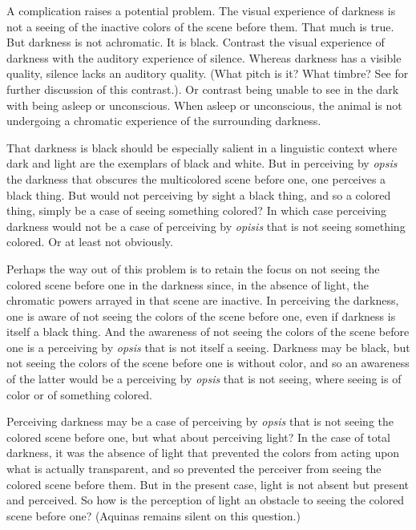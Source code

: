 A complication raises a potential problem. The visual experience of darkness is not a seeing of the inactive colors of the scene before them. That much is true. But darkness is not achromatic. It is black. Contrast the visual experience of darkness with the auditory experience of silence. Whereas darkness has a visible quality, silence lacks an auditory quality. (What pitch is it? What timbre? See \citealt{Sorensen:2009aa} for further discussion of this contrast.). Or contrast being unable to see in the dark with being asleep or unconscious. When asleep or unconscious, the animal is not undergoing a chromatic experience of the surrounding darkness.

That darkness is black should be especially salient in a linguistic context where dark and light are the exemplars of black and white. But in perceiving by \emph{opsis} the darkness that obscures the multicolored scene before one, one perceives a black thing. But would not perceiving by sight a black thing, and so a colored thing, simply be a case of seeing something colored? In which case perceiving darkness would not be a case of perceiving by \emph{opisis} that is not seeing something colored. Or at least not obviously.

Perhaps the way out of this problem is to retain the focus on not seeing the colored scene before one in the darkness since, in the absence of light, the chromatic powers arrayed in that scene are inactive. In perceiving the darkness, one is aware of not seeing the colors of the scene before one, even if darkness is itself a black thing. And the awareness of not seeing the colors of the scene before one is a perceiving by \emph{opsis} that is not itself a seeing. Darkness may be black, but not seeing the colors of the scene before one is without color, and so an awareness of the latter would be a perceiving by \emph{opsis} that is not seeing, where seeing is of color or of something colored.

Perceiving darkness may be a case of perceiving by \emph{opsis} that is not seeing the colored scene before one, but what about perceiving light? In the case of total darkness, it was the absence of light that prevented the colors from acting upon what is actually transparent, and so prevented the perceiver from seeing the colored scene before them. But in the present case, light is not absent but present and perceived. So how is the perception of light an obstacle to seeing the colored scene before one? (Aquinas remains silent on this question.)

